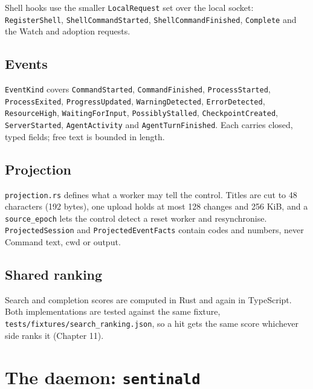 Shell hooks use the smaller \texttt{LocalRequest} set over the local socket: \texttt{RegisterShell}, \texttt{Shell\allowbreak{}Command\allowbreak{}Started}, \texttt{Shell\allowbreak{}Command\allowbreak{}Finished}, \texttt{Complete} and the Watch and adoption requests.

\section{\texorpdfstring{Events}{Events}}

\texttt{EventKind} covers \texttt{CommandStarted}, \texttt{CommandFinished}, \texttt{ProcessStarted}, \texttt{ProcessExited}, \texttt{ProgressUpdated}, \texttt{WarningDetected}, \texttt{ErrorDetected}, \texttt{ResourceHigh}, \texttt{WaitingForInput}, \texttt{PossiblyStalled}, \texttt{CheckpointCreated}, \texttt{ServerStarted}, \texttt{AgentActivity} and \texttt{AgentTurnFinished}. Each carries closed, typed fields; free text is bounded in length.

\section{\texorpdfstring{Projection}{Projection}}

\texttt{projection.\allowbreak{}rs} defines what a worker may tell the control. Titles are cut to 48 characters (192 bytes), one upload holds at most 128 changes and 256 KiB, and a \texttt{source\_\allowbreak{}epoch} lets the control detect a reset worker and resynchronise. \texttt{ProjectedSession} and \texttt{ProjectedEventFacts} contain codes and numbers, never Command text, cwd or output.

\section{\texorpdfstring{Shared ranking}{Shared ranking}}

Search and completion scores are computed in Rust and again in TypeScript. Both implementations are tested against the same fixture, \texttt{tests/\allowbreak{}fixtures/\allowbreak{}search\_\allowbreak{}ranking.\allowbreak{}json}, so a hit gets the same score whichever side ranks it (Chapter 11).

\chapter{\texorpdfstring{The daemon: \texttt{sentinald}}{The daemon: sentinald}}

